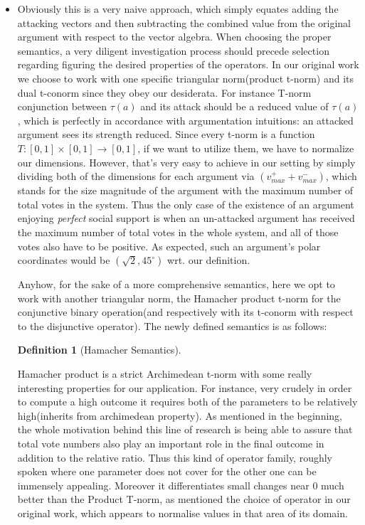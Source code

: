 \documentclass{article}
\newtheorem{definition}{Definition}
\begin{document}
{\begin{itemize}
\item Obviously this is a very naive approach, which simply equates adding the attacking vectors and then subtracting the combined value from the original argument with respect to the vector algebra. When choosing the proper semantics, a very diligent investigation process should precede selection regarding figuring the desired properties of the operators. In our original work we choose to work with one specific triangular norm(product t-norm) and its dual t-conorm since they obey our desiderata. For instance T-norm conjunction between $\tau(a)$ and its attack should be a reduced value of $\tau(a)$, which is perfectly in accordance with argumentation intuitions: an attacked argument sees its strength reduced. Since every t-norm is a function $T: [0, 1] \times [0, 1] \rightarrow [0, 1] $, if we want to utilize them, we have to normalize our dimensions. However, that's very easy to achieve in our setting by simply dividing both of the dimensions for each argument via $(v^{+}_{max} + v^{-}_{max})$, which stands for the size magnitude of the argument with the maximum number of total votes in the system. Thus the only case of the existence of an argument enjoying \textit{perfect} social support is when an un-attacked argument has received the maximum number of total votes in the whole system, and all of those votes also have to be positive. As expected, such an argument's polar coordinates would be $(\sqrt 2, 45^{\circ})$ wrt. our definition.

Anyhow, for the sake of a more comprehensive semantics, here we opt to work with another triangular norm, the Hamacher product t-norm for the conjunctive binary operation(and respectively with its t-conorm with respect to the disjunctive operator). The newly defined semantics is as follows:

\begin{definition} [Hamacher Semantics]
\end{definition}

 Hamacher product is a strict Archimedean t-norm with some really interesting properties for our application. For instance, very crudely in order to compute a high outcome it requires both of the parameters to be relatively high(inherits from archimedean property). As mentioned in the beginning, the whole motivation behind this line of research is being able to assure that total vote numbers also play an important role in the final outcome in addition to the relative ratio. Thus this kind of operator family, roughly spoken where  one parameter does not cover for the other one can be immensely appealing. Moreover it differentiates small changes near 0 much better than the Product T-norm, as mentioned the choice of operator in our original work, which appears to normalise values in that area of its domain.


\end{itemize}}
\end{document}
